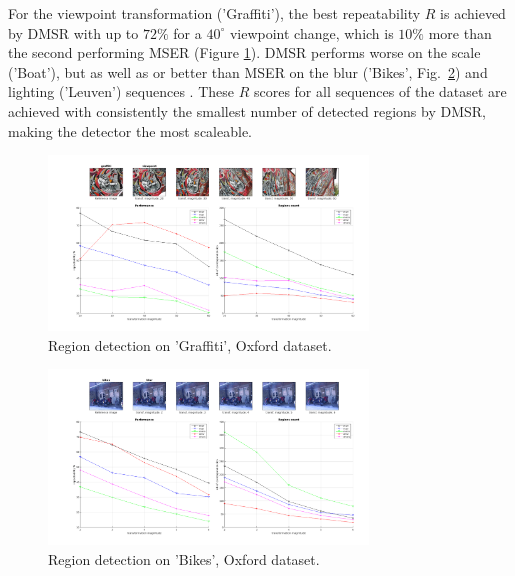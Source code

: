 \documentclass[conference,compsoc]{IEEEtran}
\begin{document}
For the viewpoint transformation ('Graffiti'), the best repeatability $R$ is achieved by DMSR with up to $72\%$ for a $40^{\circ}$ viewpoint change, which is $10\%$ more than the second performing MSER (Figure \ref{fig:rep_graffiti}). DMSR performs worse on the scale ('Boat'), but as well as or better than MSER on the blur ('Bikes', Fig.~\ref{fig:det_bikes}) and lighting ('Leuven') sequences \cite{elena_ranguelova_2016_45156}. These $R$ scores for all sequences of the dataset are achieved with consistently the smallest number of detected regions by DMSR, making the detector the most scaleable.  
\begin{figure}[htb]
\centering
\begin{minipage}[b]{.99\linewidth}
  \centering
  \centerline{\includegraphics[width=8.5cm]{repeatability_all_affine_graffiti_viewpoint}}
\end{minipage}
\hfill
\caption{Region detection on 'Graffiti', Oxford dataset.}
\label{fig:rep_graffiti}
%
\end{figure}
\begin{figure}[htb]
\centering
\begin{minipage}[b]{.99\linewidth}
  \centering
  \centerline{\includegraphics[width=8.5cm]{repeatability_all_affine_bikes_blur}}
\end{minipage}
\hfill
\caption{Region detection on 'Bikes', Oxford dataset.}
\label{fig:det_bikes}
%
\end{figure}
\end{document}
